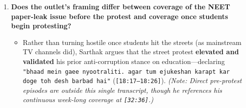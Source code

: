 \documentclass[10pt,a4paper]{article}
\begin{document}
\begin{enumerate}[leftmargin=1.6em, itemsep=4pt, topsep=4pt]
\begin{itemize}[leftmargin=1.4em, itemsep=2pt, topsep=2pt]
  \end{itemize}
  \item \textbf{Does the outlet's framing differ between coverage of the NEET paper-leak issue before the protest and coverage once students begin protesting?}
  \begin{itemize}[leftmargin=1.4em, itemsep=2pt, topsep=2pt]
    \item Rather than turning hostile once students hit the streets (as mainstream TV channels did), Sarthak argues that the street protest \textbf{elevated and validated} his prior anti-corruption stance on education---declaring \texttt{"bhaad mein gaee nyootraliti. agar tum ejukeshan karapt kar doge toh desh barbad hai"} (\texttt{[18:17--18:26]}). \textit{(Note: Direct pre-protest episodes are outside this single transcript, though he references his continuous week-long coverage at \texttt{[32:36]}.)}
  \end{itemize}
\end{enumerate}
\end{document}
